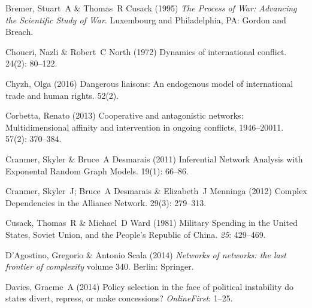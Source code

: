 \documentclass[3p,times,twocolumn,authoryear,12pt]{elsarticle}
\begin{document}
\begin{thebibliography}{}
Bremer, Stuart~A  \& Thomas~R Cusack (1995) {\em The Process of War: Advancing
  the Scientific Study of War}.
\newblock Luxembourg and Philadelphia, PA: Gordon and Breach.

Choucri, Nazli  \& Robert~C North (1972) Dynamics of international conflict.
 { 24\/}(2): 80--122.

Chyzh, Olga (2016) Dangerous liaisons: An endogenous model of international
  trade and human rights.
 { 52\/}(2).

Corbetta, Renato (2013) Cooperative and antagonistic networks: Multidimensional
  affinity and intervention in ongoing conflicts, 1946--20011.
 { 57\/}(2): 370--384.

Cranmer, Skyler  \& Bruce~A Desmarais (2011) {Inferential Network Analysis with
  Exponental Random Graph Models}.
 { 19\/}(1): 66--86.

Cranmer, Skyler~J; Bruce~A Desmarais  \& Elizabeth~J Menninga (2012) {Complex
  Dependencies in the Alliance Network}.
 { 29\/}(3): 279--313.

Cusack, Thomas~R  \& Michael~D Ward (1981) {Military Spending in the {U}nited
  {S}tates, {S}oviet {U}nion, and the {P}eople's {R}epublic of {C}hina}.
 {\em 25}: 429--469.

D'Agostino, Gregorio  \& Antonio Scala (2014) {\em Networks of networks: the
  last frontier of complexity} volume 340.
\newblock Berlin: Springer.

Davies, Graeme~A (2014) Policy selection in the face of political instability
  do states divert, repress, or make concessions?
 {\em OnlineFirst}: 1--25.


\end{thebibliography}
\end{document}
